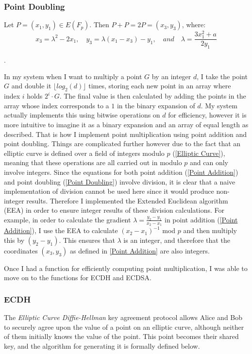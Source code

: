 \documentclass[12pt,a4paper]{article}
\begin{document}
\subsubsection{Point Doubling} \noindent \label{Point Doubling}
Let $P = (x_1,y_1) \in E(F_p)$. 
Then $P + P = 2P = (x_3,y_3)$, where:
\begin{equation}
    x_3 = \lambda^2 - 2x_1, \quad y_3 = \lambda(x_1 - x_3) - y_1, \quad and \quad \lambda = \frac{3x_1^2 + a}{2y_1}
\end{equation}

\cite{hankerson2003guide,lopez2000overview}.

\vspace{5mm}

In my system when I want to multiply a point $G$ by an integer $d$, 
I take the point $G$ and double it $\lfloor log_2(d) \rfloor$ times, storing each new point in an array where index $i$ holds $2^i \cdot G$. 
The final value is then calculated by adding the points in the array whose index corresponds to a $1$ in the binary expansion of $d$. 
My system actually implements this using bitwise operations on $d$ for efficiency, 
however it is more intuitive to imagine it as a binary expansion and an array of equal length as described. 
That is how I implement point multiplication using point addition and point doubling. 
Things are complicated further however due to the fact that an elliptic curve is defined over a field of integers modulo $p$ (\ref{Elliptic Curve}), 
meaning that these operations are all carried out in modulo $p$ and can only involve integers. 
Since the equations for both point addition (\ref{Point Addition}) and point doubling (\ref{Point Doubling}) involve division, 
it is clear that a naive implementation of division cannot be used here since it would produce non-integer results. 
Therefore I implemented the Extended Euclidean algorithm (EEA) in order to ensure integer results of these division calculations. 
For example, in order to calculate the gradient $\lambda = \frac{y_2-y_1}{x_2-x_1}$ in point addition (\ref{Point Addition}), 
I use the EEA to calculate $(x_2-x_1)^{-1}$ mod $p$ and then multiply this by $(y_2-y_1)$. 
This ensures that $\lambda$ is an integer, and therefore that the coordinates $(x_3,y_3)$ as defined in \ref{Point Addition} 
are also integers. 

Once I had a function for efficiently computing point multiplication, I was able to move on to the functions for ECDH and ECDSA. 

\subsubsection{ECDH} \noindent \label{ECDH}
The \emph{Elliptic Curve Diffie-Hellman} key agreement protocol allows Alice and Bob 
to securely agree upon the value of a point on an elliptic curve, although neither of them initially knows the value of the point. 
This point becomes their shared key, and the algorithm for generating it is formally defined below. 
\end{document}
